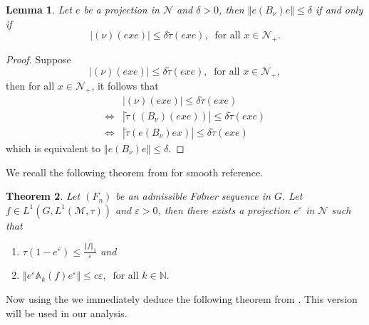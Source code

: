 \documentclass[11pt]{amsart}
\newtheorem{thm}{Theorem}[section]
\newtheorem{lem}[thm]{Lemma}
\theoremstyle{definition}
\theoremstyle{myremark}
\numberwithin{equation}{section}
\def\A{\mathbb A}
\def\N{\mathbb N}
\newcommand{\CM}{\mathcal{M}}
\newcommand{\CN}{\mathcal{N}}
\newcommand{\eps}{\varepsilon}
\newcommand{\abs}[1]{\left\vert#1\right\vert}
\newcommand{\norm}[1]{\left\Vert#1\right\Vert}
\begin{document}
\begin{lem}\label{norm}
Let   $ e $  be a  projection in $\CN$ and $ \delta >0$, then $ \norm{e(B_\nu)e} \leq \delta $ if and only if $$\abs{(\nu)(exe)} \leq \delta \widetilde{\tau}(exe),  ~ \text{ for all } x \in \CN_+.$$
   \end{lem}
\begin{proof}
Suppose 
$$\abs{(\nu)(exe)} \leq \delta \widetilde{\tau}(exe),  ~ \text{ for all } x \in \CN_+,$$
then for all $ x \in \CN_+$, it follows that  
\begin{align*}
&\abs{(\nu)(exe)} \leq \delta \widetilde{\tau}(exe)\\
\Leftrightarrow & \abs{ \widetilde{\tau}((B_\nu )(exe))} \leq \delta \widetilde{\tau}(exe) \\
\Leftrightarrow & \abs{ \widetilde{\tau}(e(B_\nu)ex)} \leq \delta \widetilde{\tau}(exe)
 \end{align*}
which is equivalent to $\norm{e(B_\nu)e} \leq \delta$.

\end{proof}



\noindent We recall the following theorem from \cite{cadilhac2022noncommutative}
for smooth reference. 
\begin{thm}\label{amenable-max}
Let $(F_n)$ be an admissible F\o lner sequence in $G$. Let $f \in L^1\left(G, L^1(\CM,  \tau)\right)$ and $\eps > 0$, then there exists a projection $e^\eps$ in $\CN$ such that 
\begin{enumerate}
        \item $ \tau( 1-e^\eps) \leq \frac{\norm{ f}_1}{ \eps}$ and 
        \item $ \norm{ e^\eps \A_k(f) e^\eps }\leq c \eps, ~ \text{ for all } k \in \N.$
    \end{enumerate}
\end{thm}




\noindent Now using the  we immediately deduce the following theorem from . This version will be used in our analysis. 
\end{document}
